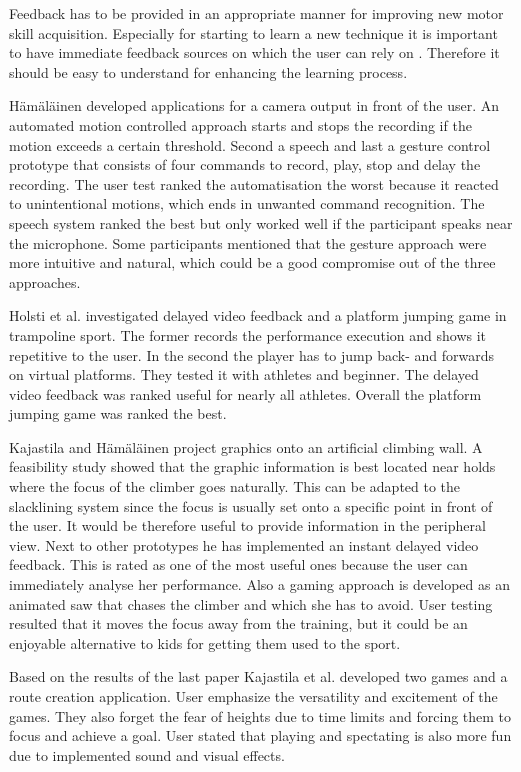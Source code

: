 Feedback has to be provided in an appropriate manner for improving new motor skill acquisition. Especially for starting to learn a new technique it is important to have immediate feedback sources on which the user can rely on \cite{Hodges2002-gb} \cite{Winstein1990-to}. Therefore it should be easy to understand for enhancing the learning process. 

Hämäläinen \cite{Hmlinen2004-ai} developed applications for a camera output in front of the user. An automated motion controlled approach starts and stops the recording if the motion exceeds a certain threshold. Second a speech and last a gesture control prototype that consists of four commands to record, play, stop and delay the recording. The user test ranked the automatisation the worst because it reacted to unintentional motions, which ends in unwanted command recognition. The speech system ranked the best but only worked well if the participant speaks near the microphone. Some participants mentioned that the gesture approach were more intuitive and natural, which could be a good compromise out of the three approaches.

Holsti et al. \cite{Holsti2013-kn} investigated delayed video feedback and a platform jumping game in trampoline sport. The former records the performance execution and shows it repetitive to the user. In the second the player has to jump back- and forwards on virtual platforms. They tested it with athletes and beginner. The delayed video feedback was ranked useful for nearly all athletes. Overall the platform jumping game was ranked the best.

Kajastila and Hämäläinen \cite{Kajastila2014-ug} project graphics onto an artificial climbing wall. A feasibility study showed that the graphic information is best located near holds where the focus of the climber goes naturally. This can be adapted to the slacklining system since the focus is usually set onto a specific point in front of the user. It would be therefore useful to provide information in the peripheral view. Next to other prototypes he has implemented an instant delayed video feedback. This is rated as one of the most useful ones because the user can immediately analyse her performance. Also a gaming approach is developed as an animated saw that chases the climber and which she has to avoid. User testing resulted that it moves the focus away from the training, but it could be an enjoyable alternative to kids for getting them used to the sport. 

Based on the results of the last paper Kajastila et al. \cite{Kajastila2016-ot} developed two games and a route creation application. User emphasize the versatility and excitement of the games. They also forget the fear of heights due to time limits and forcing them to focus and achieve a goal. User stated that playing and spectating is also more fun due to implemented sound and visual effects.

